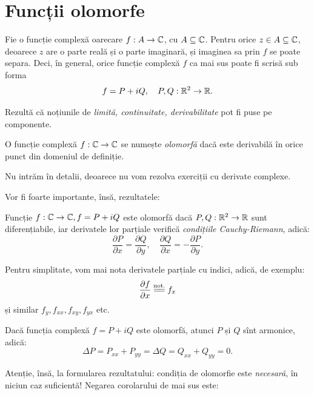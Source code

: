 \section{Funcții olomorfe}

Fie o funcție complexă oarecare $ f : A \to \mathbb{C} $, cu $ A \subseteq \mathbb{C} $.
Pentru orice $ z \in A \subseteq \mathbb{C} $, deoarece $ z $ are o parte reală și
o parte imaginară, și imaginea sa prin $ f $ se poate separa. Deci, în general,
orice funcție complexă $ f $ ca mai sus poate fi scrisă sub forma
\[
  f = P + iQ, \quad P, Q : \mathbb{R}^2 \to \mathbb{R}.
\]

Rezultă că noțiunile de \emph{limită, continuitate, derivabilitate} pot fi puse
pe componente.

\begin{definition}\label{def:olo}
  O funcție complexă $ f : \mathbb{C} \to \mathbb{C} $ se numește \emph{olomorfă} dacă este
  derivabilă în orice punct din domeniul de definiție.
\end{definition}

Nu intrăm în detalii, deoarece nu vom rezolva exerciții cu derivate complexe.

Vor fi foarte importante, însă, rezultatele:

\begin{theorem}\label{thm:cauchy-riemann}
  Funcție $ f : \mathbb{C} \to \mathbb{C}, f = P + iQ $ este olomorfă dacă $ P, Q : \mathbb{R}^2 \to \mathbb{R} $
  sunt diferențiabile, iar derivatele lor parțiale verifică \emph{condițiile %
    Cauchy-Riemann}, adică:
  \[
    \dfrac{\partial P}{\partial x} = \dfrac{\partial Q}{\partial y}, \quad %
    \dfrac{\partial Q}{\partial x} = -\dfrac{\partial P}{\partial y}.
  \]
\end{theorem}

\begin{remark}\label{rk:der-part}
  Pentru simplitate, vom mai nota derivatele parțiale cu indici, adică, de exemplu:
  \[
    \dfrac{\partial f}{\partial x} \stackrel{\dr{not.}}{=\joinrel=} f_x
  \]
  și similar $ f_y, f_{xx}, f_{xy}, f_{yx} $ etc.
\end{remark}

\begin{corollary}\label{cor:olo-arm}
  Dacă funcția complexă $ f = P + iQ $ este olomorfă, atunci $ P $ și $ Q $ sînt
  armonice, adică:
  \[
    \Delta P = P_{xx} + P_{yy} = \Delta Q = Q_{xx} + Q_{yy} = 0.
  \]
\end{corollary}

Atenție, însă, la formularea rezultatului: condiția de olomorfie este \emph{necesară},
în niciun caz suficientă! Negarea corolarului de mai sus este:

